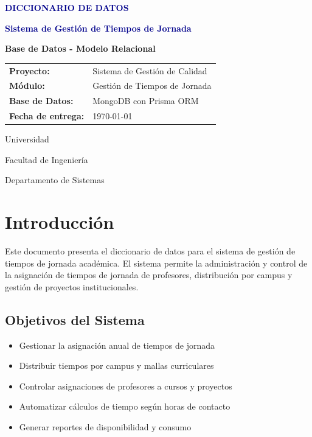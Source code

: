\documentclass[11pt,a4paper]{article}
\begin{document}
\begin{titlepage}
    \centering
    \vspace*{2cm}
    
    {\Huge\textcolor{darkblue}{\textbf{DICCIONARIO DE DATOS}}}
    
    \vspace{1cm}
    
    {\Large\textcolor{darkblue}{\textbf{Sistema de Gestión de Tiempos de Jornada}}}
    
    \vspace{2cm}
    
    {\large\textbf{Base de Datos - Modelo Relacional}}
    
    \vspace{3cm}
    
    \begin{tabular}{ll}
        \textbf{Proyecto:} & Sistema de Gestión de Calidad \\
        \textbf{Módulo:} & Gestión de Tiempos de Jornada \\
        \textbf{Base de Datos:} & MongoDB con Prisma ORM \\
        \textbf{Fecha de entrega:} & \today \\
    \end{tabular}
    
    \vfill
    
    {\large Universidad}
    
    {\large Facultad de Ingeniería}
    
    {\large Departamento de Sistemas}
    
\end{titlepage}

\newpage
\tableofcontents
\newpage

\section{Introducción}

Este documento presenta el diccionario de datos para el sistema de gestión de tiempos de jornada académica. El sistema permite la administración y control de la asignación de tiempos de jornada de profesores, distribución por campus y gestión de proyectos institucionales.

\subsection{Objetivos del Sistema}
\begin{itemize}
    \item Gestionar la asignación anual de tiempos de jornada
    \item Distribuir tiempos por campus y mallas curriculares
    \item Controlar asignaciones de profesores a cursos y proyectos
    \item Automatizar cálculos de tiempo según horas de contacto
    \item Generar reportes de disponibilidad y consumo
\end{itemize}
\end{document}

